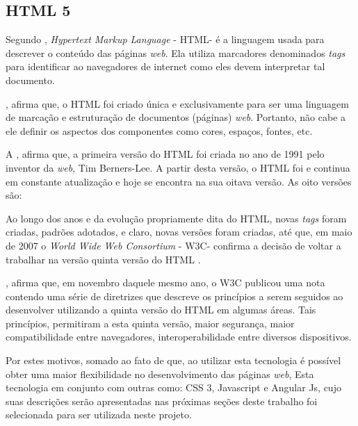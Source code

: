 \subsection{HTML 5}

Segundo , \textit{Hypertext Markup Language}  - HTML\footnotemark[23] - é a linguagem usada para descrever o conteúdo das páginas \textit{web}. Ela utiliza marcadores denominados \textit{tags} para identificar ao navegadores de internet como eles devem interpretar tal documento.

, afirma que, o HTML foi criado única e exclusivamente para ser uma linguagem de marcação e estruturação de documentos (páginas) \textit{web}. Portanto, não cabe a ele definir os aspectos dos componentes como cores, espaços, fontes, etc.


A , afirma que, a primeira versão do HTML foi criada no ano de 1991 pelo inventor da \textit{web}, Tim Berners-Lee. A partir desta versão, o HTML foi e continua em constante atualização e hoje se encontra na sua oitava versão. As oito versões são: 

Ao longo dos anos e da evolução propriamente dita do HTML, novas \textit{tags} foram criadas, padrões adotados, e claro, novas versões foram criadas, até que, em maio de 2007  o \textit{World Wide Web Consortium} - W3C\footnotemark[24] - confirma a decisão de voltar a trabalhar na versão quinta versão do HTML \cite{w3c_html_fundamentals}.


, afirma que, em novembro daquele mesmo ano, o W3C publicou uma nota contendo uma série de diretrizes que descreve os princípios a serem seguidos ao desenvolver utilizando a quinta versão do HTML em algumas áreas. Tais princípios, permitiram a esta quinta versão, maior segurança, maior compatibilidade entre navegadores, interoperabilidade entre diversos dispositivos.

Por estes motivos, somado ao fato de que, ao utilizar esta tecnologia é possível obter uma maior flexibilidade no desenvolvimento das páginas \textit{web}, Esta tecnologia em conjunto com outras como: CSS 3, Javascript e Angular Js, cujo suas descrições serão apresentadas nas próximas seções deste trabalho foi selecionada para ser utilizada neste projeto.